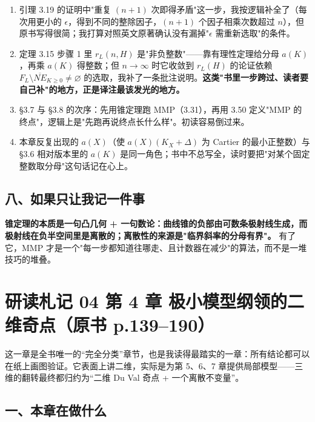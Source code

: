 \begin{enumerate}
\item 引理 3.19 的证明中"重复 $(n+1)$ 次即得矛盾"这一步，我按逻辑补全了（每次用更小的 $\epsilon$，得到不同的整除因子，$(n+1)$ 个因子相乘次数超过 $n$），但原书写得很简；我打算对照英文原著确认没有漏掉"$\epsilon$ 需重新选取"的条件。
\item 定理 3.15 步骤 1 里 $r_L(n,H)$ 是"非负整数"——靠有理性定理给分母 $a(K)$，再乘 $a(K)$ 得整数；但 $n\to\infty$ 时它收敛到 $r_L(H)$ 的论证依赖 $F_L\setminus\overline{NE}_{K\ge0}\ne\varnothing$ 的选取，我补了一条批注说明。\textbf{这类"书里一步跨过、读者要自己补"的地方，正是译注最该发光的地方。}
\item \S3.7 与 \S3.8 的次序：先用锥定理跑 MMP（3.31），再用 3.50 定义"MMP 的终点"，逻辑上是"先跑再说终点长什么样"。初读容易倒过来。
\item 本章反复出现的 $a(X)$（使 $a(X)(K_X+\Delta)$ 为 Cartier 的最小正整数）与 \S3.6 相对版本里的 $a(K)$ 是同一角色；书中不总写全，读时要把"对某个固定整数取分母"这句话记在心上。
\end{enumerate}

\subsection*{八、如果只让我记一件事}

\textbf{锥定理的本质是一句凸几何 + 一句数论：曲线锥的负部由可数条极射线生成，而极射线在负半空间里是离散的；离散性的来源是"临界斜率的分母有界"。} 有了它，MMP 才是一个"每一步都知道往哪走、且计数器在减少"的算法，而不是一堆技巧的堆叠。

\section*{研读札记 04 \textperiodcentered{} 第 4 章 极小模型纲领的二维奇点（原书 p.139--190）}

这一章是全书唯一的“完全分类”章节，也是我读得最踏实的一章：所有结论都可以在纸上画图验证。它表面上讲二维，实际是为第 5、6、7 章提供局部模型——三维的翻转最终都归约为“二维 Du Val 奇点 + 一个离散不变量”。

\subsection*{一、本章在做什么}

